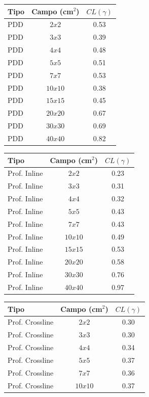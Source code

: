 \begin{table}
\centering
{}

\begin{tabular}{lcc}
\toprule
Tipo & Campo (cm$^2$) & $CL(\gamma)$\\
\midrule
PDD & $2x2$ & 0.53\\
PDD & $3x3$ & 0.39\\
PDD & $4x4$ & 0.48\\
PDD & $5x5$ & 0.51\\
PDD & $7x7$ & 0.53\\
PDD & $10x10$ & 0.38\\
PDD & $15x15$ & 0.45\\
PDD & $20x20$ & 0.67\\
PDD & $30x30$ & 0.69\\
PDD & $40x40$ & 0.82\\
\bottomrule
\end{tabular}
\vspace*{.2cm}
\begin{tabular}{lcc}
\toprule
Tipo & Campo (cm$^2$) & $CL(\gamma)$\\
\midrule
Prof. Inline & $2x2$ & 0.23\\
Prof. Inline & $3x3$ & 0.31\\
Prof. Inline & $4x4$ & 0.32\\
Prof. Inline & $5x5$ & 0.43\\
Prof. Inline & $7x7$ & 0.43\\
Prof. Inline & $10x10$ & 0.49\\
Prof. Inline & $15x15$ & 0.53\\
Prof. Inline & $20x20$ & 0.58\\
Prof. Inline & $30x30$ & 0.76\\
Prof. Inline & $40x40$ & 0.97\\
\bottomrule
\end{tabular}
\vspace*{.2cm}
\begin{tabular}{lcc}
\toprule
Tipo & Campo (cm$^2$) & $CL(\gamma)$\\
\midrule
Prof. Crossline & $2x2$ & 0.30\\
Prof. Crossline & $3x3$ & 0.30\\
Prof. Crossline & $4x4$ & 0.34\\
Prof. Crossline & $5x5$ & 0.37\\
Prof. Crossline & $7x7$ & 0.36\\
Prof. Crossline & $10x10$ & 0.37\\

\end{tabular}
\end{table}
